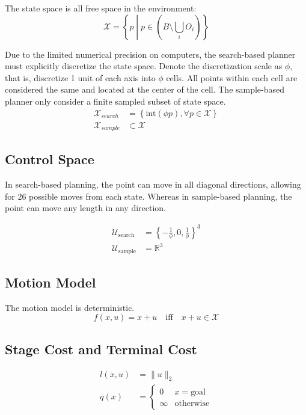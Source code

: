 \documentclass[conference]{IEEEtran}
\begin{document}
The state space is all free space in the environment:
\[
\mathcal{X} = \left\{ p \middle| p \in \left( B \setminus \bigcup_i O_i \right) \right\}
\]

Due to the limited numerical precision on computers, 
the search-based planner must explicitly discretize the state space. 
Denote the discretization scale as $\phi$, that is, discretize 1 unit of each axis into $\phi$ cells.
All points within each cell are considered the same and located at the center of the cell.
The sample-based planner only consider a finite sampled subset of state space.
$$
\begin{aligned}
    \mathcal{X}_{search} &= \left\{ \text{int}(\phi p), \forall p \in \mathcal{X} \right\} \\
    \mathcal{X}_{sample} &\subset \mathcal{X}
\end{aligned}
$$

\subsection{Control Space}
In search-based planning, 
the point can move in all diagonal directions, 
allowing for 26 possible moves from each state. 
Whereas in sample-based planning, the point can move any length in any direction.

\[
\begin{aligned}
    \mathcal{U}_{\text{search}} &= \left\{ -\frac{1}{\phi}, 0, \frac{1}{\phi} \right\}^{3} \\ 
    \mathcal{U}_{\text{sample}} &= \mathbb{R}^{3}
\end{aligned}
\]

\subsection{Motion Model}
The motion model is deterministic.
\[
f(x, u) = x + u \quad \text{iff} \quad x + u \in \mathcal{X}
\]

\subsection{Stage Cost and Terminal Cost}
\[
\begin{aligned}
    l(x, u) &= \| u \|_{2} \\
    q(x) &= \begin{cases} 
        0 & x = \text{goal} \\ 
        \infty & \text{otherwise}
    \end{cases}
\end{aligned}
\]
\end{document}
